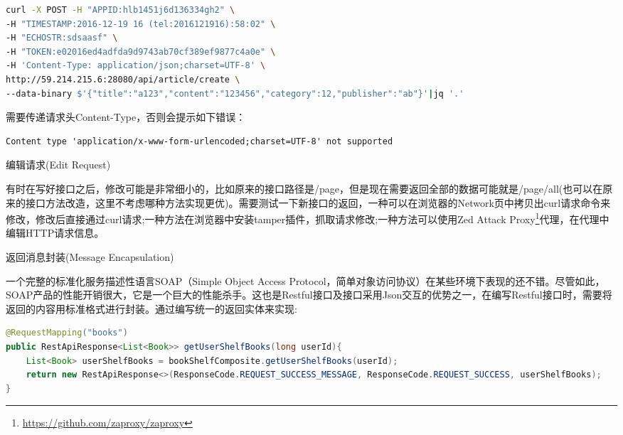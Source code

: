 \documentclass[12pt]{book}
\makeatletter
\numberwithin{dummy}{section}
\theoremstyle{ocrenumbox}
\theoremstyle{blacknumex}
\theoremstyle{blacknumbox}
\theoremstyle{ocrenum}
\renewcommand{\subsection}{\@startsection {subsection}{2}{\z@}
	{-3ex \@plus -0.1ex \@minus -.4ex}
	{0.5ex \@plus.2ex }
	{\normalfont\sffamily\bfseries}}
\renewcommand\paragraph{\@startsection{paragraph}{4}{\z@}
	{-2ex \@plus-.2ex \@minus .2ex}
	{.1ex}
	{\normalfont\small\sffamily\bfseries}}
\newlength\esp
\makeatother
\begin{document}
\begin{lstlisting}[language=Bash]
curl -X POST -H "APPID:hlb1451j6d136334gh2" \
-H "TIMESTAMP:2016-12-19 16 (tel:2016121916):58:02" \
-H "ECHOSTR:sdsaasf" \
-H "TOKEN:e02016ed4adfda9d9743ab70cf389ef9877c4a0e" \
-H 'Content-Type: application/json;charset=UTF-8' \
http://59.214.215.6:28080/api/article/create \
--data-binary $'{"title":"a123","content":"123456","category":12,"publisher":"ab"}'|jq '.'
\end{lstlisting}

需要传递请求头Content-Type，否则会提示如下错误：

\begin{lstlisting}
Content type 'application/x-www-form-urlencoded;charset=UTF-8' not supported
\end{lstlisting}

\paragraph{编辑请求(Edit Request)}

有时在写好接口之后，修改可能是非常细小的，比如原来的接口路径是/page，但是现在需要返回全部的数据可能就是/page/all(也可以在原来的接口方法改造，这里不考虑哪种方法实现更优)。需要测试一下新接口的返回，一种可以在浏览器的Network页中拷贝出curl请求命令来修改，修改后直接通过curl请求;一种方法在浏览器中安装tamper插件，抓取请求修改;一种方法可以使用Zed Attack Proxy\footnote{\url{https://github.com/zaproxy/zaproxy}}代理，在代理中编辑HTTP请求信息。


\subsection{返回消息封装(Message Encapsulation)}

一个完整的标准化服务描述性语言SOAP（Simple Object Access Protocol，简单对象访问协议）在某些环境下表现的还不错。尽管如此，SOAP产品的性能开销很大，它是一个巨大的性能杀手。这也是Restful接口及接口采用Json交互的优势之一，在编写Restful接口时，需要将返回的内容用标准格式进行封装。通过编写统一的返回实体来实现:

\begin{lstlisting}[language=Java]
@RequestMapping("books")
public RestApiResponse<List<Book>> getUserShelfBooks(long userId){
	List<Book> userShelfBooks = bookShelfComposite.getUserShelfBooks(userId);
	return new RestApiResponse<>(ResponseCode.REQUEST_SUCCESS_MESSAGE, ResponseCode.REQUEST_SUCCESS, userShelfBooks);
}
\end{lstlisting}
\end{document}
